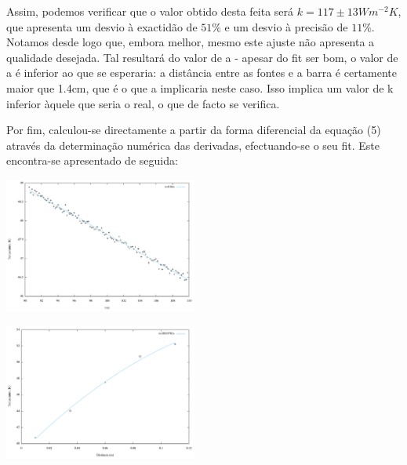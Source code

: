\documentclass[8pt]{extarticle}
\begin{document}
\begin{multicols}{2}
\par Assim, podemos verificar que o valor obtido desta feita será $k=117\pm13 Wm^{-2}K$, que apresenta um desvio à exactidão de $51\%$ e um desvio à precisão de $11\%$. Notamos desde logo que, embora melhor, mesmo este ajuste não apresenta a qualidade desejada. Tal resultará do valor de a - apesar do fit ser bom, o valor de a é inferior ao que se esperaria: a distância entre as fontes e a barra é certamente maior que 1.4cm, que é o que a implicaria neste caso. Isso implica um valor de k inferior àquele que seria o real, o que de facto se verifica.

\par Por fim, calculou-se directamente a partir da forma diferencial da equação (5) através da determinação numérica das derivadas, efectuando-se o seu fit. Este encontra-se apresentado de seguida:

\begin{center}
\includegraphics[width=180pt]{xfixo.pdf}
\par{}
\end{center}

\begin{center}
\includegraphics[width=180pt]{tfixo.pdf}
\par{}
\end{center}


\end{multicols}
\end{document}
